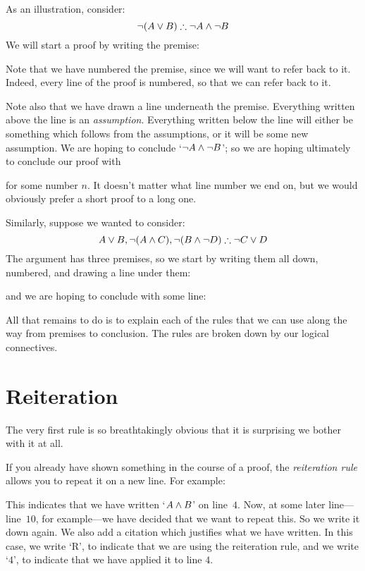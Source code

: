 As an illustration, consider:
	$$\enot (A \eor B) \therefore \enot A \eand \enot B$$
We will start a proof by writing the premise:
\begin{fitchproof}
	\PR
\end{fitchproof}
Note that we have numbered the premise, since we will want to refer back to it. Indeed, every line of the proof is numbered, so that we can refer back to it.

Note also that we have drawn a line underneath the premise. Everything written above the line is an \emph{assumption}. Everything written below the line will either be something which follows from the assumptions, or it will be some new assumption. We are hoping to conclude `$\neg A \wedge \neg B$'; so we are hoping ultimately to conclude our proof with
\begin{fitchproof}
\end{fitchproof}
for some number $n$. It doesn't matter what line number we end on, but we would obviously prefer a short proof to a long one.

Similarly, suppose we wanted to consider:
$$A\eor B, \enot (A\eand C), \enot (B \eand \enot D) \therefore \enot C\eor D$$
The argument has three premises, so we start by writing them all down, numbered, and drawing a line under them:
\begin{fitchproof}
	\PR
	\PR
	\PR
\end{fitchproof}
and we are hoping to conclude with some line:
\begin{fitchproof}
\end{fitchproof}
All that remains to do is to explain each of the rules that we can use along the way from premises to conclusion. The rules are broken down by our logical connectives.

\section{Reiteration}
The very first rule is so breathtakingly obvious that it is surprising we bother with it at all.

If you already have shown something in the course of a proof, the \emph{reiteration rule} allows you to repeat it on a new line. For example:
\begin{fitchproof}
	\ellipsesline
	 
\end{fitchproof}
This indicates that we have written `$A \wedge B$' on line~$4$. Now, at some later line---line~$10$, for example---we have decided that we want to repeat this. So we write it down again. We also add a citation which justifies what we have written. In this case, we write `R', to indicate that we are using the reiteration rule, and we write `$4$', to indicate that we have applied it to line $4$.

